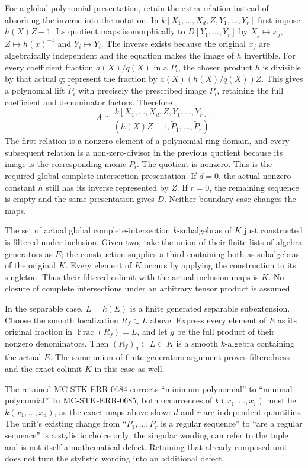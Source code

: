 For a global polynomial presentation, retain the extra relation instead of absorbing the inverse into the notation. In \(k[X_1,\ldots,X_d,Z,Y_1,\ldots,Y_r]\) first impose \(h(X)Z-1\). Its quotient maps isomorphically to \(D[Y_1,\ldots,Y_r]\) by \(X_j\mapsto x_j\), \(Z\mapsto h(x)^{-1}\) and \(Y_i\mapsto Y_i\). The inverse exists because the original \(x_j\) are algebraically independent and the equation makes the image of \(h\) invertible. For every coefficient fraction \(a(X)/q(X)\) in a \(P_i\), the chosen product \(h\) is divisible by that actual \(q\); represent the fraction by \(a(X)(h(X)/q(X))Z\). This gives a polynomial lift \(\widetilde P_i\) with precisely the prescribed image \(P_i\), retaining the full coefficient and denominator factors. Therefore \[
 A\cong
 \frac{k[X_1,\ldots,X_d,Z,Y_1,\ldots,Y_r]}
 {(h(X)Z-1,\widetilde P_1,\ldots,\widetilde P_r)}.
\] The first relation is a nonzero element of a polynomial-ring domain, and every subsequent relation is a non-zero-divisor in the previous quotient because its image is the corresponding monic \(P_i\). The quotient is nonzero. This is the required global complete-intersection presentation. If \(d=0\), the actual nonzero constant \(h\) still has its inverse represented by \(Z\). If \(r=0\), the remaining sequence is empty and the same presentation gives \(D\). Neither boundary case changes the maps.

The set of actual global complete-intersection \(k\)-subalgebras of \(K\) just constructed is filtered under inclusion. Given two, take the union of their finite lists of algebra generators as \(E\); the construction supplies a third containing both as subalgebras of the original \(K\). Every element of \(K\) occurs by applying the construction to its singleton. Thus their filtered colimit with the actual inclusion maps is \(K\). No closure of complete intersections under an arbitrary tensor product is assumed.

In the separable case, \(L=k(E)\) is a finite generated separable subextension. Choose the smooth localization \(R_f\subset L\) above. Express every element of \(E\) as its original fraction in \(\operatorname{Frac}(R_f)=L\), and let \(g\) be the full product of their nonzero denominators. Then \((R_f)_g\subset L\subset K\) is a smooth \(k\)-algebra containing the actual \(E\). The same union-of-finite-generators argument proves filteredness and the exact colimit \(K\) in this case as well.

The retained MC-STK-ERR-0684 corrects ``minimum polynomial'' to ``minimal polynomial''. In MC-STK-ERR-0685, both occurrences of \(k(x_1,\ldots,x_r)\) must be \(k(x_1,\ldots,x_d)\), as the exact maps above show: \(d\) and \(r\) are independent quantities. The unit's existing change from ``\(P_1,\ldots,P_r\) is a regular sequence'' to ``are a regular sequence'' is a stylistic choice only; the singular wording can refer to the tuple and is not itself a mathematical defect. Retaining that already composed unit does not turn the stylistic wording into an additional defect.

